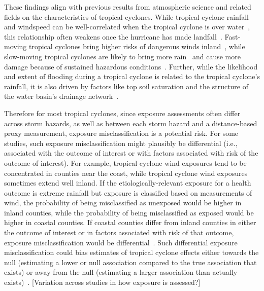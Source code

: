 These findings align with previous results from atmospheric science and related
fields on the characteristics of tropical cyclones. While tropical cyclone
rainfall and windspeed can be well-correlated when the tropical cyclone is
over water~\parencite{cerveny2000}, this relationship often weakens once the
hurricane has made landfall~\parencite{jiang2008}.  Fast-moving tropical
cyclones bring higher risks of dangerous winds inland~\parencite{kruk2010},
while slow-moving tropical cyclones are likely to bring more
rain~\parencite{rappaport2000} and cause more damage because of sustained
hazardous conditions~\parencite{rezapour2014}. Further, while the likelihood
and extent of flooding during a tropical cyclone is related to the tropical
cyclone's rainfall, it is also driven by factors like top soil saturation and
the structure of the water basin's drainage network~\parencite{chen2015,
rees2001}. 

Therefore for most tropical cyclones, since exposure assessments often differ
across storm hazards, as well as between each storm hazard and a distance-based
proxy measurement, exposure misclassification is a potential risk. For some
studies, such exposure misclassification might plausibly be differential (i.e.,
associated with the outcome of interest or with factors associated with risk of
the outcome of interest).  For example, tropical cyclone wind exposures tend to
be concentrated in counties near the coast, while tropical cyclone wind
exposures sometimes extend well inland.  If the etiologically-relevant exposure
for a health outcome is extreme rainfall but exposure is classified based on
measurements of wind, the probability of being misclassified as unexposed would
be higher in inland counties, while the probability of being misclassified as
exposed would be higher in coastal counties. If coastal counties differ from
inland counties in either the outcome of interest or in factors associated with
risk of that outcome, exposure misclassification would be
differential~\parencite{savitz2016interpreting}.  Such differential exposure
misclassification could bias estimates of tropical cyclone effects either
towards the null (estimating a lower or null association compared to the true
association that exists) or away from the null (estimating a larger association
than actually exists)~\parencite{savitz2016interpreting, armstrong1998effect}.
[Variation across studies in how exposure is assessed?]

